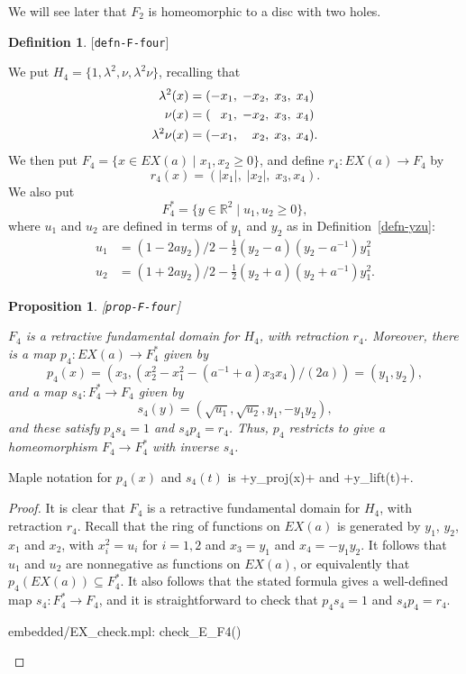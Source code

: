 \documentclass[reqno]{amsart}
\newcommand{\lbl}[1]{\label{#1}\textup{[\texttt{#1}]}\par}
\newcommand{\lbl}{\label}
\newcommand{\lm}        {\lambda}
\newcommand{\R}         {{\mathbb{R}}}
\newcommand{\st}        {\;|\;}
\newcommand{\sse}       {\subseteq}
\newcommand{\half}      {\tfrac{1}{2}}
\newcommand{\pp}        {\hphantom{+}}
\renewcommand{\:}{\colon}
\newtheorem{proposition}[theorem]{Proposition}
\theoremstyle{definition}
\newtheorem{definition}[theorem]{Definition}
\begin{document}
We will see later that $F_2$ is homeomorphic to a disc with two holes.

\begin{definition}\lbl{defn-F-four}
 We put $H_4=\{1,\lm^2,\nu,\lm^2\nu\}$, recalling that
 \begin{align*}
  \lm^2(x)    &= (-x_1,\;-x_2,\;x_3,\;x_4) \\
  \nu(x)      &= (\pp x_1,\;-x_2,\;x_3,\;x_4) \\
  \lm^2\nu(x) &= (-x_1,\;\pp x_2,\;x_3,\;x_4).
 \end{align*}
 We then put $F_4=\{x\in EX(a)\st x_1,x_2\geq 0\}$, and define
 $r_4\:EX(a)\to F_4$ by
 \[ r_4(x) = (|x_1|,\;|x_2|,\;x_3,x_4). \]
 We also put
 \[ F_4^* = \{y\in\R^2\st u_1,u_2\geq 0\}, \]
 where $u_1$ and $u_2$ are defined in terms of $y_1$ and $y_2$ as in
 Definition~\ref{defn-yzu}:
 \begin{align*}
  u_1 &= (1-2ay_2)/2 - \half(y_2-a)(y_2-a^{-1})y_1^2 \\
  u_2 &= (1+2ay_2)/2 - \half(y_2+a)(y_2+a^{-1})y_1^2.
 \end{align*}
\end{definition}

\begin{proposition}\lbl{prop-F-four}
 $F_4$ is a retractive fundamental domain for $H_4$, with retraction
 $r_4$.  Moreover, there is a map $p_4\:EX(a)\to F_4^*$ given by
 \[ p_4(x) = (x_3,(x_2^2 - x_1^2 - (a^{-1}+a)x_3x_4)/(2a))=(y_1,y_2), \]
 and a map $s_4\:F_4^*\to F_4$ given by
 \[ s_4(y) = (\sqrt{u_1},\sqrt{u_2},y_1,-y_1y_2), \]
 and these satisfy $p_4s_4=1$ and $s_4p_4=r_4$.  Thus, $p_4$ restricts
 to give a homeomorphism $F_4\to F_4^*$ with inverse $s_4$.
\end{proposition}
Maple notation for $p_4(x)$ and $s_4(t)$ is \mcode+y_proj(x)+ and
\mcode+y_lift(t)+.
\begin{proof}
 It is clear that $F_4$ is a retractive fundamental domain for $H_4$, with
 retraction $r_4$.  Recall that the ring of functions on $EX(a)$ is
 generated by $y_1$, $y_2$, $x_1$ and $x_2$, with $x_i^2=u_i$ for
 $i=1,2$ and $x_3=y_1$ and $x_4=-y_1y_2$.  It follows that $u_1$ and
 $u_2$ are nonnegative as functions on $EX(a)$, or equivalently that
 $p_4(EX(a))\sse F_4^*$.  It also follows that the stated formula gives a
 well-defined map $s_4\:F_4^*\to F_4$, and it is straightforward to
 check that $p_4s_4=1$ and $s_4p_4=r_4$.
 \begin{checks}
  embedded/EX_check.mpl: check_E_F4()
 \end{checks}
\end{proof}
\end{document}
